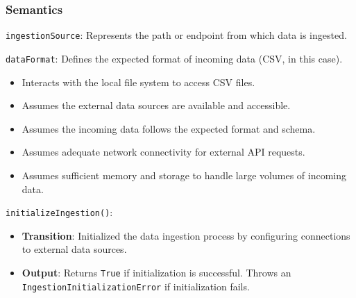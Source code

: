 \documentclass[12pt, titlepage]{article}
\begin{document}
\subsubsection{Semantics}
\begin{description}
  \item[State Variables:]
  \item
  \texttt{ingestionSource}: Represents the path or endpoint from which data is ingested.
  \item
  \texttt{dataFormat}: Defines the expected format of incoming data (CSV, in this case).

  \item[Environment Variables:]
  \item
  \begin{itemize}
    \item Interacts with the local file system to access CSV files.
  \end{itemize}

  \item[Assumptions:]
  \item
  \begin{itemize}
    \item Assumes the external data sources are available and accessible.
  \end{itemize}
  \item
  \begin{itemize}
    \item Assumes the incoming data follows the expected format and schema.
  \end{itemize}
  \item 
  \begin{itemize}
    \item Assumes adequate network connectivity for external API requests.
  \end{itemize}
  \item
  \begin{itemize}
    \item Assumes sufficient memory and storage to handle large volumes of incoming data.
  \end{itemize}

  \item[Access Routine Semantics:] 
  \item
  \texttt{initializeIngestion()}:
  \item
  \begin{itemize}
    \item \textbf{Transition}: Initialized the data ingestion process by configuring connections to
    external data sources.
  \end{itemize}
  \item
  \begin{itemize}
    \item \textbf{Output}: Returns \texttt{True} if initialization is successful. Throws an
    \\ \texttt{IngestionInitializationError} if initialization fails.
  \end{itemize}
  \item 


\end{description}
\end{document}
